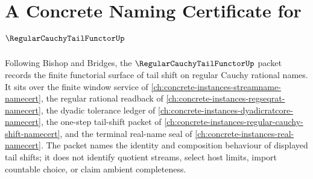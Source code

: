 \chapter{A Concrete Naming Certificate for $\RegularCauchyTailFunctorUp$}
\label{ch:concrete-instances-regular-cauchy-tail-functor-namecert}

Following Bishop and Bridges, the $\RegularCauchyTailFunctorUp$ packet records the finite functorial surface of tail shift on regular Cauchy rational names. It sits over the finite window service of \autoref{ch:concrete-instances-streamname-namecert}, the regular rational readback of \autoref{ch:concrete-instances-regseqrat-namecert}, the dyadic tolerance ledger of \autoref{ch:concrete-instances-dyadicratcore-namecert}, the one-step tail-shift packet of \autoref{ch:concrete-instances-regular-cauchy-shift-namecert}, and the terminal real-name seal of \autoref{ch:concrete-instances-real-namecert}. The packet names the identity and composition behaviour of displayed tail shifts; it does not identify quotient streams, select host limits, import countable choice, or claim ambient completeness.

